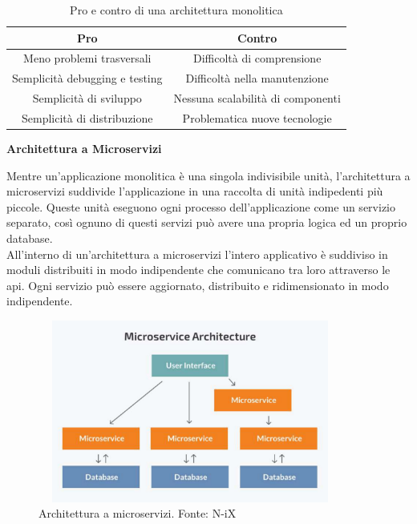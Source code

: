 \begin{table}[H]
    \centering
    \begin{tabular}{ |c|c| }
        \hline
        Pro & Contro \\
        \hline
        Meno problemi trasversali & Difficoltà di comprensione \\
        Semplicità debugging e testing & Difficoltà nella manutenzione \\
        Semplicità di sviluppo & Nessuna scalabilità di componenti \\
        Semplicità di distribuzione & Problematica nuove tecnologie \\
        \hline
    \end{tabular}
    \caption{Pro e contro di una architettura monolitica}
\end{table}
\begin{flushleft}
\textbf{{\large Architettura a Microservizi}}
\end{flushleft}

Mentre un'applicazione monolitica è una singola indivisibile unità, l'architettura a microservizi suddivide l'applicazione in una raccolta di unità indipedenti più piccole. Queste unità eseguono ogni processo dell'applicazione come un servizio separato, così ognuno di questi servizi può avere una propria logica ed un proprio database.\\
All'interno di un'architettura a microservizi l'intero applicativo è suddiviso in moduli distribuiti in modo indipendente che comunicano tra loro attraverso le \Gls{api}. Ogni servizio può essere aggiornato, distribuito e ridimensionato in modo indipendente.

\begin{figure}[H]
    \centering
    \includegraphics[width=10cm, height=6cm]{images/micro.pdf}
    \caption{Architettura a microservizi. Fonte: N-iX}
\end{figure}

